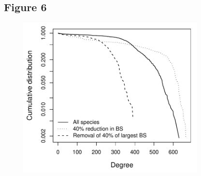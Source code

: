 \documentclass[12pt]{article}
\begin{document}
\newpage
\subsection*{Figure 6}

\begin{figure}[ht!]
	\centering\includegraphics[width=0.85\textwidth]{Degree.pdf}
\end{figure}
\end{document}
